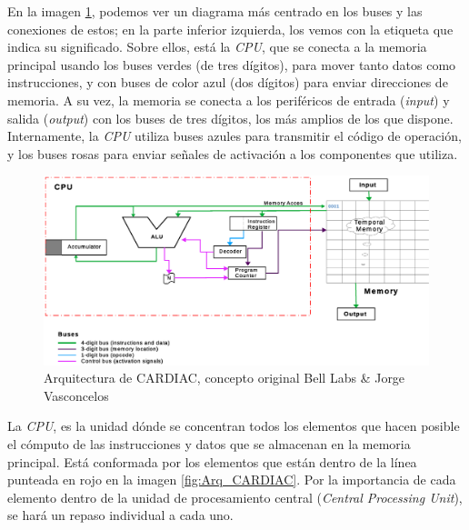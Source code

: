 \documentclass[letterpaper,12pt,oneside]{book}
\begin{document}

	En la imagen \ref{fig:Arquitectura_diagrama_original}, podemos ver un diagrama
	más centrado en los buses y las conexiones de estos; en la parte inferior izquierda, 
	los vemos con la etiqueta que indica su significado. Sobre ellos, está la \textit{CPU},
	que se conecta a la memoria principal usando los 
	buses verdes (de tres dígitos),
	para mover tanto datos como instrucciones, y
	con buses de color azul (dos dígitos) para enviar direcciones de memoria. A su vez, 
	la memoria se conecta a los periféricos de entrada (\textit{input})
	y salida (\textit{output}) con los buses de tres dígitos, los más amplios de los que dispone.
	Internamente, la \textit{CPU} utiliza buses azules para transmitir
	el código de operación, y los buses rosas para enviar señales de activación
	a los componentes que utiliza.	
	
	\begin{figure}[ht]
 			\centering
			\includegraphics[scale=0.5]{media/CARDIACC/Arquitectura_diagrama_original.eps}
			\caption{Arquitectura de CARDIAC, concepto original Bell Labs \& Jorge Vasconcelos}
			\label{fig:Arquitectura_diagrama_original}
	\end{figure}
	
	
	
	La \textit{CPU}, es la unidad dónde se concentran todos los elementos que hacen 
	posible el cómputo de las instrucciones y datos
	que se almacenan en la memoria principal.
	Está conformada por los elementos que están dentro de la línea punteada en rojo en la imagen
	 \ref{fig:Arq_CARDIAC}. Por la importancia
	de cada elemento dentro de la unidad de procesamiento central (\textit{Central Processing Unit}),
	se hará un repaso individual a cada uno.
	
\end{document}

